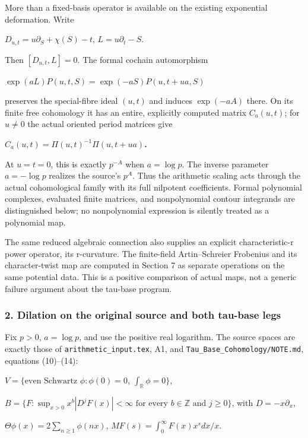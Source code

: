 More than a fixed-basis operator is available on the existing exponential deformation. Write

\(D_{u,t}=u \partial_S+\chi(S)-t\), \(L=u \partial_t-S\).

Then \([D_{u,t},L]=0\). The formal cochain automorphism

\textbf{\(\exp(a L)P(u,t,S)=\exp(-aS) P(u,t+ua,S)\)}

preserves the special-fibre ideal \((u,t)\) and induces \(\exp(-aA)\) there. On its finite free cohomology it has an entire, explicitly computed matrix \(C_a(u,t)\); for \(u\ne 0\) the actual oriented period matrices give

\textbf{\(C_a(u,t)=\Pi(u,t)^{-1}\Pi(u,t+ua)\).}

At \(u=t=0\), this is exactly \(p^{-A}\) when \(a=\log p\). The inverse parameter \(a=-\log p\) realizes the source's \(p^A\). Thus the arithmetic scaling acts through the actual cohomological family with its full nilpotent coefficients. Formal polynomial complexes, evaluated finite matrices, and nonpolynomial contour integrands are distinguished below; no nonpolynomial expression is silently treated as a polynomial map.

The same reduced algebraic connection also supplies an explicit characteristic-r power operator, its r-curvature. The finite-field Artin--Schreier Frobenius and its character-twist map are computed in Section 7 as separate operations on the same potential data. This is a positive comparison of actual maps, not a generic failure argument about the tau-base program.

\subsubsection{2. Dilation on the original source and both tau-base legs}\label{endpoint-f1_scaling--dilation-on-the-original-source-and-both-tau-base-legs}

Fix \(p>0\), \(a=\log p\), and use the positive real logarithm. The source spaces are exactly those of \nolinkurl{arithmetic_input.tex}, A1, and \nolinkurl{Tau_Base_Cohomology/NOTE.md}, equations (10)--(14):

\(V=\{\text{even Schwartz }\phi:\phi(0)=0,\ \int_{\mathbb R}\phi=0\}\),

\(B=\{F:\sup_{x>0}x^b|D^jF(x)|<\infty\text{ for every }b\in\mathbb Z\text{ and }j\ge 0\}\), with \(D=-x \partial_x\),

\(\Theta \phi(x)=2 \sum_{n\ge 1}\phi(nx)\), \(MF(s)=\int_0^\infty F(x)x^s dx/x\).

